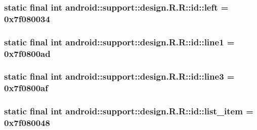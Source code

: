\hypertarget{classandroid_1_1support_1_1design_1_1_r_1_1id_c8f95e2b833155a377bd8d81809f3ccf}{
\subsubsection[{left}]{\setlength{\rightskip}{0pt plus 5cm}static final int android::support::design.R.R::id::left = 0x7f080034}}
\label{classandroid_1_1support_1_1design_1_1_r_1_1id_c8f95e2b833155a377bd8d81809f3ccf}


\hypertarget{classandroid_1_1support_1_1design_1_1_r_1_1id_c944bfea778ae024018d9f2cad60275c}{
\subsubsection[{line1}]{\setlength{\rightskip}{0pt plus 5cm}static final int android::support::design.R.R::id::line1 = 0x7f0800ad}}
\label{classandroid_1_1support_1_1design_1_1_r_1_1id_c944bfea778ae024018d9f2cad60275c}


\hypertarget{classandroid_1_1support_1_1design_1_1_r_1_1id_f10fe351f917b6e78937a7e20c381ce5}{
\subsubsection[{line3}]{\setlength{\rightskip}{0pt plus 5cm}static final int android::support::design.R.R::id::line3 = 0x7f0800af}}
\label{classandroid_1_1support_1_1design_1_1_r_1_1id_f10fe351f917b6e78937a7e20c381ce5}


\hypertarget{classandroid_1_1support_1_1design_1_1_r_1_1id_66028bb9ff038b8f44804832eda84b52}{
\subsubsection[{list\_\-item}]{\setlength{\rightskip}{0pt plus 5cm}static final int android::support::design.R.R::id::list\_\-item = 0x7f080048}}
\label{classandroid_1_1support_1_1design_1_1_r_1_1id_66028bb9ff038b8f44804832eda84b52}


